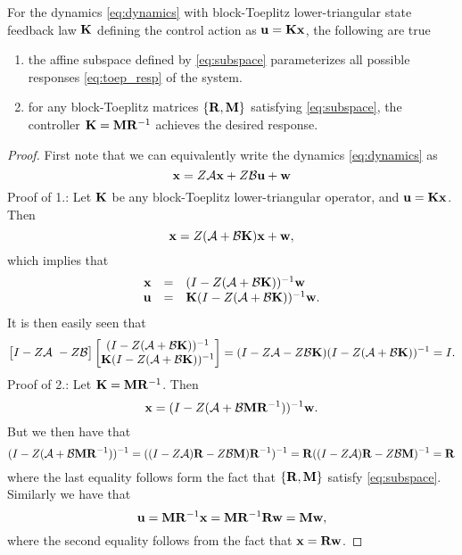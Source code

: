 \documentclass[11pt]{article}
\numberwithin{equation}{section}
\begin{document}
\begin{theorem}
For the dynamics \eqref{eq:dynamics} with block-Toeplitz lower-triangular state feedback law $\mathbf{K}$ defining the control action as $\mathbf{u} = \mathbf{K} \mathbf{x}$, the following are true
\begin{enumerate}
\item the affine subspace defined by \eqref{eq:subspace} parameterizes all possible responses \eqref{eq:toep_resp} of the system.
\item for any block-Toeplitz matrices $\{\mathbf{R}, \mathbf{M}\}$ satisfying \eqref{eq:subspace}, the controller $\mathbf{K} = \mathbf{M} \mathbf{R}^{-1}$ achieves the desired response.
\end{enumerate}
\label{thm:robust_param}
\end{theorem}
\begin{proof}
First note that we can equivalently write the dynamics \eqref{eq:dynamics} as
\begin{equation}
\mathbf{x} = Z\mathcal{A} \mathbf{x}+ Z\mathcal{B} \mathbf{u} + \mathbf{w}
\end{equation}
Proof of 1.: Let $\mathbf{K}$ be any block-Toeplitz lower-triangular operator, and $\mathbf{u} = \mathbf{K} \mathbf{x}$.  Then
\begin{equation}
\mathbf{x} = Z(\mathcal{A}+\mathcal{B}\mathbf{K})\mathbf{x} + \mathbf{w},
\end{equation}
which implies that
\begin{equation}
\begin{array}{rcl}
\mathbf{x} &=& (I-Z(\mathcal{A}+\mathcal{B}\mathbf{K}))^{-1}\mathbf{w} \\
\mathbf{u} &=& \mathbf{K}(I-Z(\mathcal{A}+\mathcal{B}\mathbf{K}))^{-1}\mathbf{w}.
\end{array}
\end{equation}
It is then easily seen that
\begin{equation}
\begin{bmatrix} I - Z\A \ -Z\B\end{bmatrix}\begin{bmatrix}(I-Z(\A+\B\tf K))^{-1} \\ \tf K (I-Z(\A+\B\tf K))^{-1} \end{bmatrix} = (I - Z\A -Z\B\tf K)(I-Z(\A+\B\tf K))^{-1} = I.
\end{equation}
Proof of 2.: Let $\mathbf{K} = \mathbf{M} \mathbf{R}^{-1}$.  Then
\begin{equation}
\mathbf{x} = (I-Z(\mathcal{A}+\mathcal{B}\mathbf{M} \mathbf{R}^{-1}))^{-1}\mathbf{w}.
\end{equation}
But we then have that
\begin{equation}
(I-Z(\mathcal{A}+\mathcal{B}\mathbf{M} \mathbf{R}^{-1}))^{-1} = ((I-Z\mathcal{A})\mathbf{R} - Z\mathcal{B} \mathbf{M})\mathbf{R}^{-1})^{-1} = \mathbf{R} ((I-Z\mathcal{A})\mathbf{R} - Z\mathcal{B} \mathbf{M})^{-1}  = \mathbf{R}
\end{equation}
where the last equality follows form the fact that $\{\mathbf{R}, \mathbf{M}\}$ satisfy \eqref{eq:subspace}.  Similarly we have that
\begin{equation}
\mathbf{u} = \mathbf{M} \mathbf{R}^{-1}\mathbf{x} = \mathbf{M} \mathbf{R}^{-1} \mathbf{R} \mathbf{w} = \mathbf{M} \mathbf{w},
\end{equation}
where the second equality follows from the fact that $\mathbf{x} = \mathbf{R} \mathbf{w}$.
\end{proof}
\end{document}
